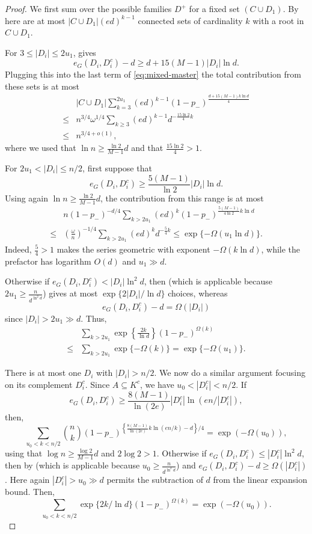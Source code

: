 \documentclass[10pt,a4paper]{article}
\begin{document}
\begin{proof}
We first sum over the possible families $D^+$ for a fixed set $(C \cup D_1)$.
By  here are at most $|C \cup D_1|(ed)^{k-1}$ connected sets of cardinality $k$ with a root in $C \cup D_1$.

For $3\le |D_i|\le2u_1$,  gives
\begin{equation*}\label{eq:component-small-boundary}
 e_G(D_i, D_i^c)-d \ge d+15(M-1)|D_i|\ln d.
\end{equation*}
Plugging this into the last term of \eqref{eq:mixed-master} the total contribution from these sets is at most
\begin{align*}
    &|C \cup D_1| \sum_{k=3}^{2u_1} (ed)^{k-1} (1-p_-)^{\frac{d+15(M-1)k \ln d}{4}}\\
    \leq & n^{3/4} \omega^{1/4} \sum_{k \geq 3} (ed)^{k-1} d^{-\frac{15 \ln 2}{4} k}\\
    \leq & n^{3/4+o(1)},
\end{align*}
where we used that $\ln n \geq \frac{\ln 2}{M-1} d$ and that $\frac{15 \ln 2}{4}>1$.

For $2u_1<|D_i|\le n/2$, first suppose that
\[
 e_G(D_i, D_i^c) \ge \frac{5(M-1)}{\ln 2}|D_i|\ln d.
\]
Using again $\ln n \geq \frac{\ln 2}{M-1}d$, the contribution from this range is at most
\begin{align*}
    &n (1-p_-)^{-d/4}\sum_{k>2u_1}(ed)^k (1-p_-)^{\frac{5(M-1)}{4 \ln 2} k \ln d}\\
    \leq & \left(\frac{\omega}{n} \right)^{-1/4} \sum_{k >2u_1} (ed)^k d^{-\frac{5}{4}k}
 \le\exp\{-\Omega(u_1\ln d)\}.
\end{align*}
Indeed, $\frac{5}{4}>1$ makes the series geometric with exponent $-\Omega(k\ln d)$, while the prefactor has logarithm $O(d)$ and $u_1\gg d$.

Otherwise if $e_G(D_i, D_i^c)<|D_i|\ln^2 d$, then  (which is applicable because $2u_1 \geq \frac{n}{d^{\ln^2 d}}$) gives at most $\exp\{2|D_i|/\ln d\}$ choices, whereas
\[
 e_G(D_i, D_i^c)-d = \Omega(|D_i|)
\]
since $|D_i|>2u_1 \gg d$. Thus,
\begin{align*}
    &\sum_{k > 2u_1} \exp\left\{ \frac{2k}{\ln d}\right\} (1-p_-)^{\Omega(k)}\\
    \leq & \sum_{k > 2u_1} \exp\{-\Omega(k)\} = \exp\{-\Omega(u_1)\}.
\end{align*}

There is at most one $D_i$ with $|D_i|>n/2$. We now do a similar argument focusing on its complement $D_i^c$. Since $A\subseteq K^c$, we have $u_0<|D_i^c|<n/2$.
If
\[
 e_G(D_i, D_i^c)\ge \frac{8(M-1)}{\ln(2e)}|D_i^c|\ln(en/|D_i^c|),
\]
then,
\[
 \sum_{u_0<k<n/2}\binom nk (1-p_-)^{\left\{\frac{8(M-1)}{\ln(2e)} k\ln(en/k)-d\right\}/4} =\exp(-\Omega(u_0)),
\]
using that $\log n \geq \frac{\log 2}{M-1} d$ and $2 \log 2>1$.
Otherwise if $e_G(D_i, D_i^c)\le |D_i^c|\ln^2d$, then by  (which is applicable because $u_0 \geq \frac{n}{d^{\ln^2 d}}$) and $e_G(D_i, D_i^c)-d\ge \Omega(|D_i^c|)$. Here again $|D_i^c|>u_0\gg d$ permits the subtraction of $d$ from the linear expansion bound. Then,
\[
\sum_{u_0<k<n/2}\exp\{2k/\ln d\}(1-p_-)^{\Omega(k)}=\exp(-\Omega(u_0)).
\]


\end{proof}
\end{document}

